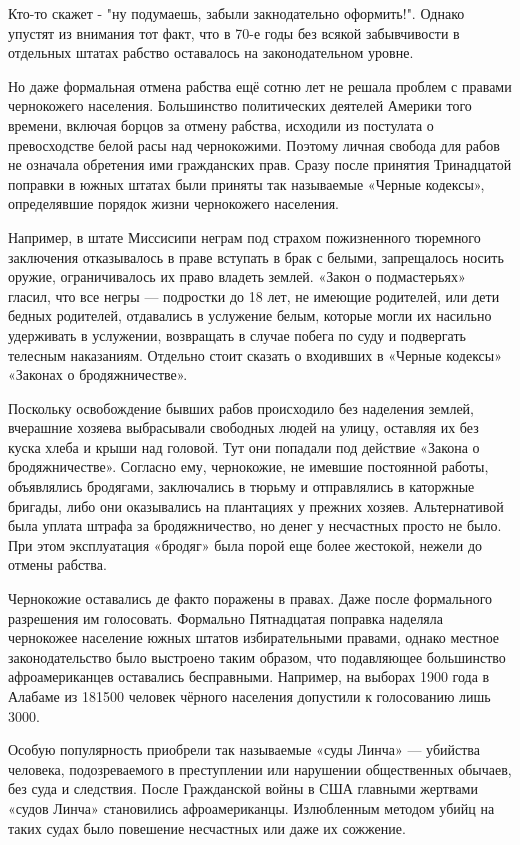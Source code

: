 Кто-то скажет - "ну подумаешь, забыли закнодательно оформить!". Однако упустят
из внимания тот факт, что в 70-е годы без всякой забывчивости в отдельных
штатах рабство оставалось на законодательном уровне.


Но даже формальная отмена рабства ещё сотню лет не решала проблем с правами
чернокожего населения. Большинство политических деятелей Америки того времени,
включая борцов за отмену рабства, исходили из постулата о превосходстве белой
расы над чернокожими. Поэтому личная свобода для рабов не означала обретения
ими гражданских прав. Сразу после принятия Тринадцатой поправки в южных штатах
были приняты так называемые «Черные кодексы», определявшие порядок жизни
чернокожего населения.

Например, в штате Миссисипи неграм под страхом пожизненного тюремного
заключения отказывалось в праве вступать в брак с белыми, запрещалось носить
оружие, ограничивалось их право владеть землей. «Закон о подмастерьях» гласил,
что все негры — подростки до 18 лет, не имеющие родителей, или дети бедных
родителей, отдавались в услужение белым, которые могли их насильно удерживать в
услужении, возвращать в случае побега по суду и подвергать телесным наказаниям.
Отдельно стоит сказать о входивших в «Черные кодексы» «Законах о
бродяжничестве».

Поскольку освобождение бывших рабов происходило без наделения землей, вчерашние
хозяева выбрасывали свободных людей на улицу, оставляя их без куска хлеба и
крыши над головой. Тут они попадали под действие «Закона о бродяжничестве».
Согласно ему, чернокожие, не имевшие постоянной работы, объявлялись бродягами,
заключались в тюрьму и отправлялись в каторжные бригады, либо они оказывались
на плантациях у прежних хозяев. Альтернативой была уплата штрафа за
бродяжничество, но денег у несчастных просто не было. При этом эксплуатация
«бродяг» была порой еще более жестокой, нежели до отмены рабства.

Чернокожие оставались де факто поражены в правах. Даже после формального
разрешения им голосовать. Формально Пятнадцатая поправка наделяла чернокожее
население южных штатов избирательными правами, однако местное законодательство
было выстроено таким образом, что подавляющее большинство афроамериканцев
оставались бесправными. Например, на выборах 1900 года в Алабаме из 181500
человек чёрного населения допустили к голосованию лишь 3000.

Особую популярность приобрели так называемые «суды Линча» — убийства человека,
подозреваемого в преступлении или нарушении общественных обычаев, без суда и
следствия. После Гражданской войны в США главными жертвами «судов Линча»
становились афроамериканцы. Излюбленным методом убийц на таких судах было
повешение несчастных или даже их сожжение.

